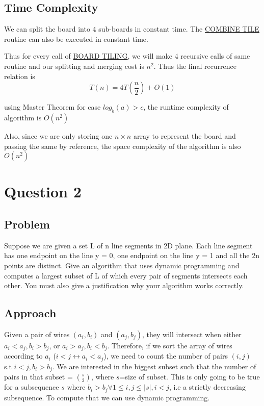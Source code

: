 \documentclass{article}
\begin{document}
\subsection{Time Complexity}

We can split the board into $4$ sub-boards in constant time. The \underline{COMBINE TILE} routine can also be executed in constant time.

Thus for every call of \underline{BOARD TILING}, we will make 4 recursive calls of same routine and our splitting and merging cost is $n^2$. Thus the final recurrence relation is \[ T(n) = 4T(\frac{n}{2}) + O(1)\]

using Master Theorem for case $log_{b}(a) > c$, the runtime complexity of algorithm is $O(n^{2})$

Also, since we are only storing one $n \times n$ array to represent the board and passing the same by reference, the space complexity of the algorithm is also $O(n^2)$

\section{Question 2}

\subsection{Problem}

Suppose we are given a set L of n line segments in 2D plane. Each line segment has one endpoint on the line y = 0, one endpoint on the line y = 1 and all the 2n points are distinct. Give an algorithm that uses dynamic programming and computes a largest subset of L of which every pair of segments intersects each other. You must also give a justification why your algorithm works correctly.

\subsection{Approach}

Given a pair of wires $(a_i,b_i)$ and $(a_j,b_j)$, they will intersect when either $a_i<a_j,b_i>b_j$, or $a_i>a_j,b_i<b_j$. Therefore, if we sort the array of wires according to $a_i$ ($i < j \leftrightarrow a_i < a_j$), we need to count the number of pairs $(i,j)$ s.t $i<j,b_i>b_j$. We are interested in the biggest subset such that the number of pairs in that subset = $s \choose 2$, where $s$=size of subset. This is only going to be true for a subsequence $s$ where  $b_i>b_j \forall 1 \leq i,j \leq |s|, i<j$, i.e a strictly decreasing subsequence. To compute that we can use dynamic programming.
\end{document}
